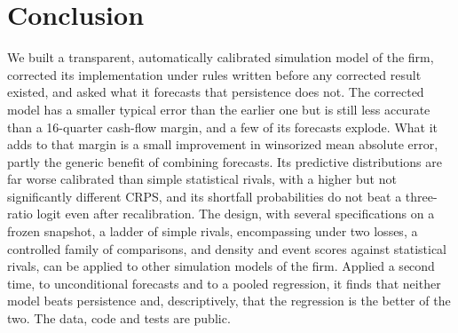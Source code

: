 \documentclass[preprint,12pt,authoryear]{elsarticle}
\begin{document}
\section{Conclusion}\label{sec:conclusion}
We built a transparent, automatically calibrated simulation model of the firm, corrected its implementation under rules written before any corrected result existed, and asked what it forecasts that persistence does not. The corrected model has a smaller typical error than the earlier one but is still less accurate than a 16-quarter cash-flow margin, and a few of its forecasts explode. What it adds to that margin is a small improvement in winsorized mean absolute error, partly the generic benefit of combining forecasts. Its predictive distributions are far worse calibrated than simple statistical rivals, with a higher but not significantly different CRPS, and its shortfall probabilities do not beat a three-ratio logit even after recalibration. The design, with several specifications on a frozen snapshot, a ladder of simple rivals, encompassing under two losses, a controlled family of comparisons, and density and event scores against statistical rivals, can be applied to other simulation models of the firm. Applied a second time, to unconditional forecasts and to a pooled regression, it finds that neither model beats persistence and, descriptively, that the regression is the better of the two. The data, code and tests are public.
\end{document}
